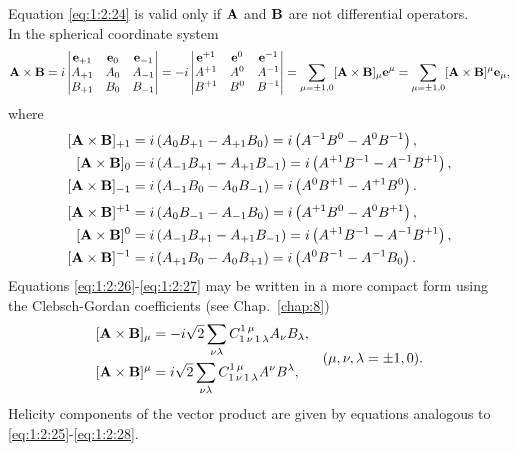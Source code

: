 Equation \eqref{eq:1:2:24} is valid only if \(\mathbf{A}\) and \(\mathbf{B}\) are not differential operators.\\
In the spherical coordinate system
\begin{equation}
\mathbf{A} \times \mathbf{B}=i\begin{vmatrix}
\mathbf{e}_{+1} & \mathbf{e}_{0} & \mathbf{e}_{-1}  \label{eq:1:2:25}\\
A_{+1} & A_{0} & A_{-1} \\
B_{+1} & B_{0} & B_{-1}
\end{vmatrix}=-i\begin{vmatrix}
\mathbf{e}^{+1} & \mathbf{e}^{0} & \mathbf{e}^{-1} \\
A^{+1} & A^{0} & A^{-1} \\
B^{+1} & B^{0} & B^{-1}
\end{vmatrix}=\sum_{\mu= \pm 1,0}[\mathbf{A} \times \mathbf{B}]_{\mu} \mathbf{e}^{\mu}=\sum_{\mu= \pm 1,0}[\mathbf{A} \times \mathbf{B}]^{\mu} \mathbf{e}_{\mu},
\end{equation}
where
\begin{align}
{[\mathbf{A} \times \mathbf{B}]_{+1} } & =i\left(A_{0} B_{+1}-A_{+1} B_{0}\right)=i\left(A^{-1} B^{0}-A^{0} B^{-1}\right),  \notag\\
{[\mathbf{A} \times \mathbf{B}]_{0} } & =i\left(A_{-1} B_{+1}-A_{+1} B_{-1}\right)=i\left(A^{+1} B^{-1}-A^{-1} B^{+1}\right) , \label{eq:1:2:26}\\
{[\mathbf{A} \times \mathbf{B}]_{-1} } & =i\left(A_{-1} B_{0}-A_{0} B_{-1}\right)=i\left(A^{0} B^{+1}-A^{+1} B^{0}\right) . \notag
\end{align}
\begin{align}
{[\mathbf{A} \times \mathbf{B}]^{+1} } & =i\left(A_{0} B_{-1}-A_{-1} B_{0}\right)=i\left(A^{+1} B^{0}-A^{0} B^{+1}\right)  ,\notag\\
{[\mathbf{A} \times \mathbf{B}]^{0} } & =i\left(A_{-1} B_{+1}-A_{+1} B_{-1}\right)=i\left(A^{+1} B^{-1}-A^{-1} B^{+1}\right) , \label{eq:1:2:27}\\
{[\mathbf{A} \times \mathbf{B}]^{-1} } & =i\left(A_{+1} B_{0}-A_{0} B_{+1}\right)=i\left(A^{0} B^{-1}-A^{-1} B_{0}\right) .\notag
\end{align}
Equations \eqref{eq:1:2:26}-\eqref{eq:1:2:27} may be written in a more compact form using the Clebsch-Gordan coefficients (see Chap.~\ref{chap:8})
\begin{equation}
\begin{aligned}
& {[\mathbf{A} \times \mathbf{B}]_{\mu}=-i \sqrt{2} \sum_{\nu \lambda} C_{1\,\nu\,1\,\lambda}^{1\,\mu} A_{\nu} B_{\lambda}} ,\\
& {[\mathbf{A} \times \mathbf{B}]^{\mu}=i \sqrt{2} \sum_{\nu \lambda} C_{1\,\nu\,1\,\lambda}^{1\,\mu} A^{\nu} B^{\lambda}},
\end{aligned}
 \quad(\mu, \nu, \lambda= \pm 1,0) .\label{eq:1:2:28}
\end{equation}
Helicity components of the vector product are given by equations analogous to \eqref{eq:1:2:25}-\eqref{eq:1:2:28}.

